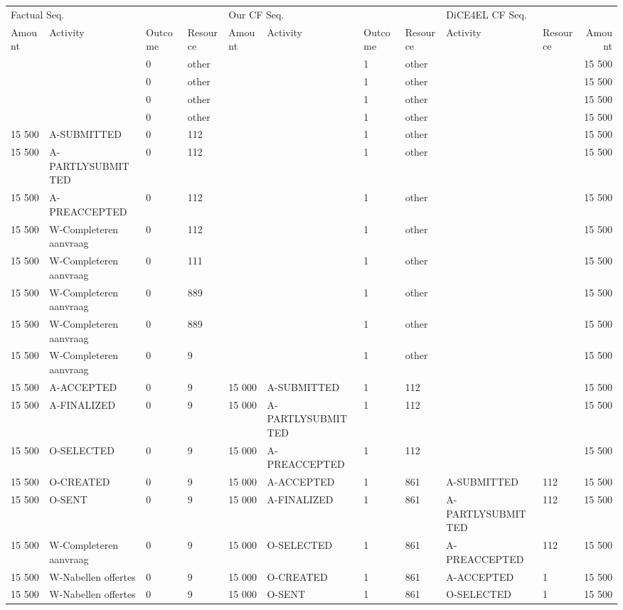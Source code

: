 \begin{tabular}{llllllllllr}
\toprule
\multicolumn{4}{l}{Factual Seq.} & \multicolumn{4}{l}{Our CF Seq.} & \multicolumn{3}{l}{DiCE4EL CF Seq.} \\
Amount & Activity & Outcome & Resource & Amount & Activity & Outcome & Resource & Activity & Resource & Amount \\
\midrule
 &  & 0 & other &  &  & 1 & other &  &  & 15 500 \\
 &  & 0 & other &  &  & 1 & other &  &  & 15 500 \\
 &  & 0 & other &  &  & 1 & other &  &  & 15 500 \\
 &  & 0 & other &  &  & 1 & other &  &  & 15 500 \\
15 500 & A-SUBMITTED & 0 & 112 &  &  & 1 & other &  &  & 15 500 \\
15 500 & A-PARTLYSUBMITTED & 0 & 112 &  &  & 1 & other &  &  & 15 500 \\
15 500 & A-PREACCEPTED & 0 & 112 &  &  & 1 & other &  &  & 15 500 \\
15 500 & W-Completeren aanvraag & 0 & 112 &  &  & 1 & other &  &  & 15 500 \\
15 500 & W-Completeren aanvraag & 0 & 111 &  &  & 1 & other &  &  & 15 500 \\
15 500 & W-Completeren aanvraag & 0 & 889 &  &  & 1 & other &  &  & 15 500 \\
15 500 & W-Completeren aanvraag & 0 & 889 &  &  & 1 & other &  &  & 15 500 \\
15 500 & W-Completeren aanvraag & 0 & 9 &  &  & 1 & other &  &  & 15 500 \\
15 500 & A-ACCEPTED & 0 & 9 & 15 000 & A-SUBMITTED & 1 & 112 &  &  & 15 500 \\
15 500 & A-FINALIZED & 0 & 9 & 15 000 & A-PARTLYSUBMITTED & 1 & 112 &  &  & 15 500 \\
15 500 & O-SELECTED & 0 & 9 & 15 000 & A-PREACCEPTED & 1 & 112 &  &  & 15 500 \\
15 500 & O-CREATED & 0 & 9 & 15 000 & A-ACCEPTED & 1 & 861 & A-SUBMITTED & 112 & 15 500 \\
15 500 & O-SENT & 0 & 9 & 15 000 & A-FINALIZED & 1 & 861 & A-PARTLYSUBMITTED & 112 & 15 500 \\
15 500 & W-Completeren aanvraag & 0 & 9 & 15 000 & O-SELECTED & 1 & 861 & A-PREACCEPTED & 112 & 15 500 \\
15 500 & W-Nabellen offertes & 0 & 9 & 15 000 & O-CREATED & 1 & 861 & A-ACCEPTED & 1 & 15 500 \\
15 500 & W-Nabellen offertes & 0 & 9 & 15 000 & O-SENT & 1 & 861 & O-SELECTED & 1 & 15 500 \\

\end{tabular}
